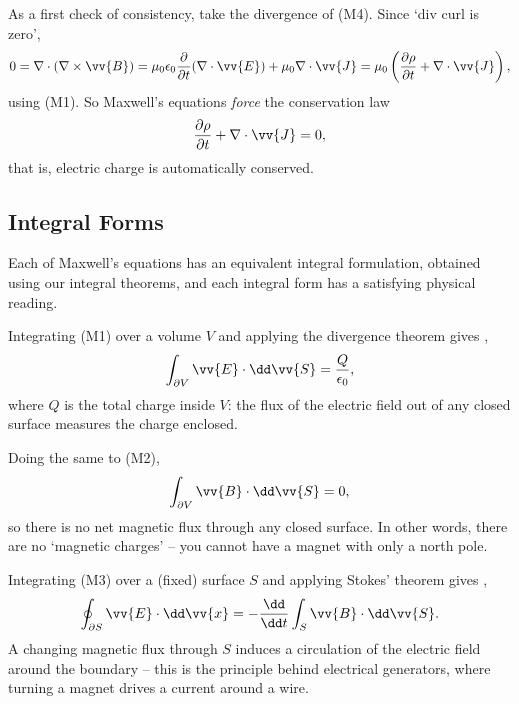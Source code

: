 As a first check of consistency, take the divergence of (M4). Since `div curl is zero',
$$
0 = \nabla \cdot (\nabla \times \vv{B}) = \mu_0 \epsilon_0 \frac{\partial}{\partial t}(\nabla \cdot \vv{E}) + \mu_0 \nabla \cdot \vv{J} = \mu_0 \left(\frac{\partial \rho}{\partial t} + \nabla \cdot \vv{J}\right),
$$
using (M1). So Maxwell's equations \emph{force} the conservation law
$$
\frac{\partial \rho}{\partial t} + \nabla \cdot \vv{J} = 0,
$$
that is, electric charge is automatically conserved.

\subsection{Integral Forms}

Each of Maxwell's equations has an equivalent integral formulation, obtained using our integral theorems, and each integral form has a satisfying physical reading.

Integrating (M1) over a volume $V$ and applying the divergence theorem gives ,
$$
\int_{\partial V} \vv{E} \cdot \dd \vv{S} = \frac{Q}{\epsilon_0},
$$
where $Q$ is the total charge inside $V$: the flux of the electric field out of any closed surface measures the charge enclosed.

Doing the same to (M2),
$$
\int_{\partial V} \vv{B} \cdot \dd \vv{S} = 0,
$$
so there is no net magnetic flux through any closed surface. In other words, there are no `magnetic charges' -- you cannot have a magnet with only a north pole.

Integrating (M3) over a (fixed) surface $S$ and applying Stokes' theorem gives ,
$$
\oint_{\partial S} \vv{E} \cdot \dd \vv{x} = -\frac{\dd}{\dd t}\int_S \vv{B} \cdot \dd \vv{S}.
$$
A changing magnetic flux through $S$ induces a circulation of the electric field around the boundary -- this is the principle behind electrical generators, where turning a magnet drives a current around a wire.

\begin{center}
\end{center}

